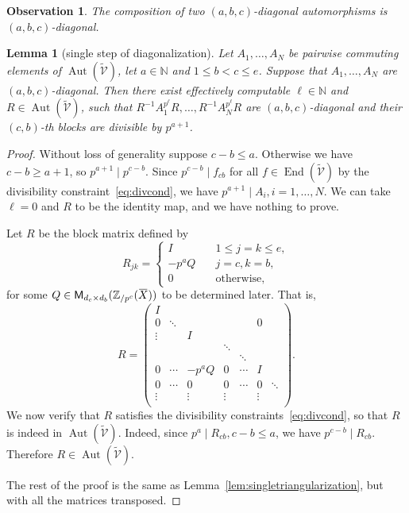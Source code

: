 \documentclass[letterpaper, 11pt, thm-restate]{article}
\numberwithin{equation}{section}
\newcommand{\Z}{\mathbb{Z}}
\newcommand{\N}{\mathbb{N}}
\newcommand{\Aut}{\operatorname{Aut}}
\newcommand{\End}{\operatorname{End}}
\newcommand{\M}{\mathsf{M}}
\newcommand{\tmV}{\widetilde{\mathcal{V}}}
\newcommand{\oX}{\mkern 1.5mu\overline{\mkern-1.5mu X \mkern-1.5mu}\mkern 1.5mu}
\newtheorem{lem}[thrm]{Lemma}
\newtheorem{obs}[thrm]{Observation}
\theoremstyle{definition}
\theoremstyle{definition}
\theoremstyle{definition}
\begin{document}
\begin{obs}
    The composition of two $(a,b,c)$-diagonal automorphisms is $(a,b,c)$-diagonal.
\end{obs}

\begin{lem}[single step of diagonalization]\label{lem:singlediagonalization}
    Let $A_1, \ldots, A_N$ be pairwise commuting elements of $\Aut(\tmV)$, let $a \in \N$ and $1 \leq b < c \leq e$. 
    Suppose that $A_1, \ldots, A_N$ are $(a,b,c)$-diagonal.
    Then there exist effectively computable $\ell \in \N$ and $R \in \Aut(\tmV)$, such that $R^{-1}A_1^{p^{\ell}}R, \ldots, R^{-1}A_N^{p^{\ell}}R$ are $(a,b,c)$-diagonal and their $(c,b)$-th blocks are divisible by $p^{a+1}$.
\end{lem}
\begin{proof}
    Without loss of generality suppose $c-b \leq a$.
    Otherwise we have $c-b \geq a+1$, so $p^{a+1} \mid p^{c-b}$.
    Since $p^{c-b} \mid f_{cb}$ for all $f \in \End(\tmV)$ by the divisibility constraint~\eqref{eq:divcond}, we have $p^{a+1} \mid A_i, i = 1, \ldots, N$. 
    We can take $\ell = 0$ and $R$ to be the identity map, and we have nothing to prove.

    Let $R$ be the block matrix defined by 
    \[
    R_{jk} = 
    \begin{cases}
        I \quad & 1 \leq j = k \leq e, \\
        -p^a Q \quad & j = c, k = b, \\
        0 \quad & \text{otherwise},
    \end{cases}
    \]
    for some $Q \in \M_{d_c \times d_b}(\Z_{/p^c}(\oX))$ to be determined later.
    That is,
    \[
    R = 
    \begin{pmatrix}
        I & & & & \\    
        0 & \ddots & &&&0 \\
        \vdots & & I \\
         & & & \ddots & \\
        & & & & \ddots & \\
        0 & \cdots & -p^a Q & 0 & \cdots & I \\
        0 & \cdots & 0 & 0 & \cdots & 0 & \ddots \\
        \vdots & & \vdots & \vdots & & \vdots \\
    \end{pmatrix}.
    \]
    We now verify that $R$ satisfies the divisibility constraints~\eqref{eq:divcond}, so that $R$ is indeed in $\Aut(\tmV)$. 
    Indeed, since $p^{a} \mid R_{cb}, c-b \leq a$, we have $p^{c-b} \mid R_{cb}$.
    Therefore $R \in \Aut(\tmV)$.
    
    The rest of the proof is the same as Lemma~\ref{lem:singletriangularization}, but with all the matrices transposed.
\end{proof}
\end{document}
